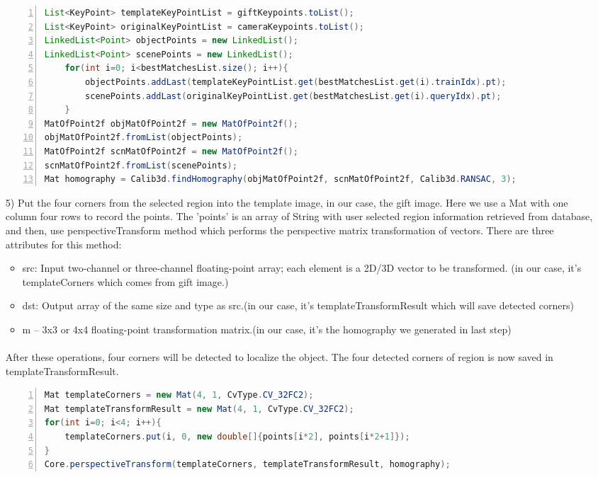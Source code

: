 \begin{enumerate}
\begin{lstlisting}[language={java},
        numbers=left,basicstyle=\small\ttfamily,breaklines=true] 
List<KeyPoint> templateKeyPointList = giftKeypoints.toList();
List<KeyPoint> originalKeyPointList = cameraKeypoints.toList();
LinkedList<Point> objectPoints = new LinkedList();
LinkedList<Point> scenePoints = new LinkedList();
    for(int i=0; i<bestMatchesList.size(); i++){
        objectPoints.addLast(templateKeyPointList.get(bestMatchesList.get(i).trainIdx).pt);
        scenePoints.addLast(originalKeyPointList.get(bestMatchesList.get(i).queryIdx).pt);
    }
MatOfPoint2f objMatOfPoint2f = new MatOfPoint2f();
objMatOfPoint2f.fromList(objectPoints);
MatOfPoint2f scnMatOfPoint2f = new MatOfPoint2f();
scnMatOfPoint2f.fromList(scenePoints);
Mat homography = Calib3d.findHomography(objMatOfPoint2f, scnMatOfPoint2f, Calib3d.RANSAC, 3);
\end{lstlisting} 
\item[5)] Put the four corners from the selected region into the template image, in our case, the gift image. Here we use a Mat with one column four rows to record the points. The 'points' is an array of String with user selected region information retrieved from database, and then, use perspectiveTransform method which performs the perspective matrix transformation of vectors. There are three attributes for this method: 
\begin{itemize}
\item src: Input two-channel or three-channel floating-point array; each element is a 2D/3D vector to be transformed. (in our case, it's templateCorners which comes from gift image.)
\item dst: Output array of the same size and type as src.(in our case, it's templateTransformResult which will save detected corners)
\item m – 3x3 or 4x4 floating-point transformation matrix.(in our case, it's the homography we generated in last step)
\end{itemize}
\paragraph{} After these operations, four corners will be detected to localize the object. The four detected corners of region is now saved in templateTransformResult.
\begin{lstlisting}[language={java},
        numbers=left,basicstyle=\small\ttfamily,breaklines=true]
Mat templateCorners = new Mat(4, 1, CvType.CV_32FC2);
Mat templateTransformResult = new Mat(4, 1, CvType.CV_32FC2);
for(int i=0; i<4; i++){
    templateCorners.put(i, 0, new double[]{points[i*2], points[i*2+1]});
}
Core.perspectiveTransform(templateCorners, templateTransformResult, homography);
\end{lstlisting} 
\end{enumerate}
